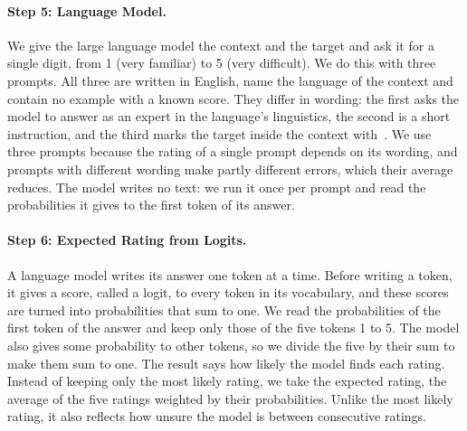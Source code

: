 \documentclass[11pt]{article}
\begin{document}
\paragraph{Step 5: Language Model.} We give the large language model the context and the target and %
ask it for a single digit, from 1 (very familiar) to 5 (very difficult). We do this with three
prompts. All three are written in English, name the language of the context and contain no example %
with a known score. They differ in wording: the first asks the model to answer as an expert in the
language's linguistics, the second is a short instruction, and the third marks the target inside %
the context with \guillemotleft\,\guillemotright. We use three prompts because the rating of a
single prompt depends on its wording, and prompts with different wording make partly different
errors, which their average reduces. The model writes no text: we run it once per prompt and read %
the probabilities it gives to the first token of its answer.

\paragraph{Step 6: Expected Rating from Logits.} A language model writes its answer one token at a
time. Before writing a token, it gives a score, called a logit, to every token in its vocabulary,
and these scores are turned into probabilities that sum to one. We read the probabilities of the
first token of the answer and keep only those of the five tokens 1 to 5. The model %
also gives some probability to other tokens, so we divide the five by their sum to make them sum to
one. The result says how likely the model finds each rating. Instead of keeping only the most likely
rating, we take the expected rating, the average of the five ratings weighted by their
probabilities. Unlike the most likely rating, it also reflects how unsure the model is between
consecutive ratings.
\end{document}
